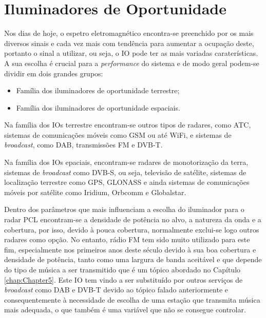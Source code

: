 \section{Iluminadores de Oportunidade} \label{IOS}
Nos dias de hoje, o espetro eletromagnético encontra-se preenchido por os mais diversos sinais e cada vez mais com tendência para aumentar a ocupação deste, portanto o sinal a utilizar, ou seja, o \gls{IO} pode ter as mais variadas caraterísticas. A sua escolha é crucial para a \textit{performance} do sistema e de modo geral podem-se dividir em dois grandes grupos:
\begin{itemize}
\item Família dos iluminadores de oportunidade terrestre;
\item Família dos iluminadores de oportunidade espaciais.
\end{itemize}\par
Na família dos \gls{IO}s terrestre encontram-se outros tipos de radares, como \gls{ATC}, sistemas de comunicações móveis como \gls{GSM} ou até \gls{WiFi}, e sistemas de \textit{broadcast}, como \gls{DAB}, transmissões \gls{FM} e \gls{DVB-T}.\par 
Na família dos \gls{IO}s epaciais, encontram-se radares de monotorização da terra, sistemas de \textit{broadcast} como \gls{DVB-S}, ou seja, televisão de satélite, sistemas de localização terrestre como \gls{GPS}, GLONASS e ainda sistemas de comunicações móveis por satélite como Iridium, Orbcomm e Globalstar.\par
Dentro dos parâmetros que mais influenciam a escolha do iluminador para o radar \gls{PCL} encontram-se a densidade de potência no alvo, a natureza da onda e a cobertura, por isso, devido à pouca cobertura, normalmente exclui-se logo outros radares como opção. No entanto, rádio \gls{FM} tem sido muito utilizado para este fim, especialmente nos primeiros anos deste século devido à sua boa cobertura e densidade de potência, tanto como uma largura de banda aceitável e que depende do tipo de música a ser transmitido que é um tópico abordado no Capítulo \ref{chap:Chapter5}. Este \gls{IO} tem vindo a ser substituído por outros serviços de \textit{broadcast} como \gls{DAB} e \gls{DVB-T} devido ao tópico falado anteriormente e consequentemente à necessidade de escolha de uma estação que transmita música mais adequada, o que também é uma variável que não se consegue controlar.


